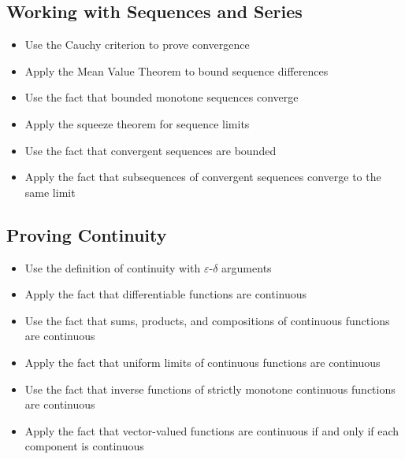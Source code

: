 \subsection*{Working with Sequences and Series}
\begin{itemize}
\item Use the Cauchy criterion to prove convergence
\item Apply the Mean Value Theorem to bound sequence differences
\item Use the fact that bounded monotone sequences converge
\item Apply the squeeze theorem for sequence limits
\item Use the fact that convergent sequences are bounded
\item Apply the fact that subsequences of convergent sequences converge to the same limit
\end{itemize}

\subsection*{Proving Continuity}
\begin{itemize}
\item Use the definition of continuity with $\varepsilon$-$\delta$ arguments
\item Apply the fact that differentiable functions are continuous
\item Use the fact that sums, products, and compositions of continuous functions are continuous
\item Apply the fact that uniform limits of continuous functions are continuous
\item Use the fact that inverse functions of strictly monotone continuous functions are continuous
\item Apply the fact that vector-valued functions are continuous if and only if each component is continuous
\end{itemize}

